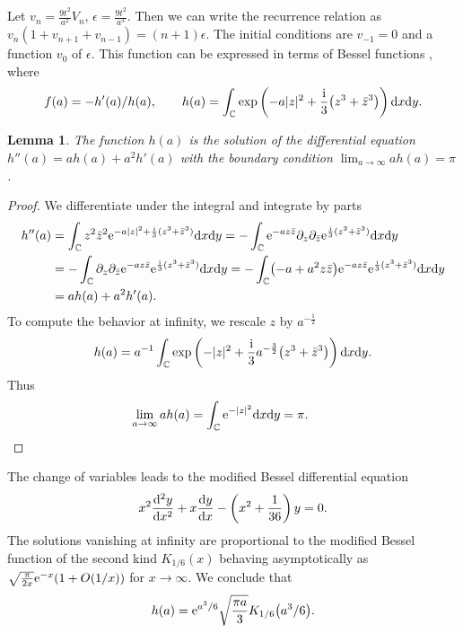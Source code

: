 \documentclass[pdftex]{sigma}
\numberwithin{equation}{section}
\newtheorem{Lemma}[Theorem]{Lemma}
\theoremstyle{definition}
\begin{document}
 Let
 $ v_n=\frac{9t^2}{a^2}V_n$, $ \epsilon = \frac{9t^2}{a^3}$.
 Then we can write the recurrence relation as $v_n(1+v_{n+1}+v_{n-1})=(n+1)\epsilon$.
The initial conditions are $v_{-1}=0$ and a function $v_0$ of $\epsilon$.
This function can be expressed in terms of Bessel functions
,
where
\[
f(a)=-h'(a)/h(a),\qquad h(a)=\int_{\mathbb C}\exp\left(-a|z|^2+\frac{\rm i}3\bigl(z^3+\bar z^3\bigr)\right){\rm d}x{\rm d}y.
\]
\begin{Lemma}\label{l-1}
The function $h(a)$ is the solution of the differential equation
$h''(a)=ah(a)+a^2h'(a)$
with the boundary condition $\lim_{a\to\infty}ah(a)=\pi$.
\end{Lemma}
\begin{proof}
 We differentiate under the integral and integrate by parts
 \begin{align*}
 h''(a)&=\int_{\mathbb C} z^2\bar z^2 {\rm e}^{-a|z|^2+\frac{\rm i}3(z^3+\bar z^3)}{\rm d}x{\rm d}y
 =-\int_{\mathbb C} {\rm e}^{-az\bar z}\partial_z\partial_{\bar z}{\rm e}^{\frac{\rm i}3(z^3+\bar z^3)}{\rm d}x{\rm d}y
 \\
 &=-\int_{\mathbb C}\partial_z \partial_{\bar z}{\rm e}^{-az\bar z}{\rm e}^{\frac{\rm i}3(z^3+\bar z^3)}{\rm d}x{\rm d}y
 =-\int_{\mathbb C}\bigl(-a+a^2z\bar z\bigr){\rm e}^{-az\bar z}{\rm e}^{\frac{\rm i}3(z^3+\bar z^3)}{\rm d}x{\rm d}y
 \\
 &=ah(a)+a^2h'(a).
 \end{align*}
 To compute the behavior at infinity, we rescale $z$ by $a^{-\frac12}$
 \[
 h(a)=a^{-1}\int_{\mathbb C} \exp\left({-|z|^2+\frac{\rm i}3a^{-\frac32}}\bigl(z^3+\bar z^3\bigr)\right){\rm d}x{\rm d}y.
 \]
 Thus
 \[
 \lim_{a\to\infty}ah(a)=\int_{\mathbb C} {\rm e}^{-|z|^2}{\rm d}x{\rm d}y=\pi.\tag*{\qed}
\]
 \renewcommand{\qed}{}
\end{proof}

The change of variables
 leads to the modified Bessel differential equation
\[
x^2\frac{{\rm d}^2y}{{\rm d}x^2}+x\frac{{\rm d}y}{{\rm d}x}-\left(x^2+\frac1{36}\right)y=0.
\]
The solutions vanishing at infinity are proportional to the modified Bessel function of the second kind $K_{1/6}(x)$ behaving asymptotically as $\sqrt{\frac\pi{2x}}{\rm e}^{-x}(1+O(1/x))$ for $x\to\infty$. We conclude that
\begin{equation}\label{e-K}
h(a)={\rm e}^{a^3/6}\sqrt{\frac{\pi a}3}K_{1/6}\bigl(a^3/6\bigr).
\end{equation}
\end{document}
